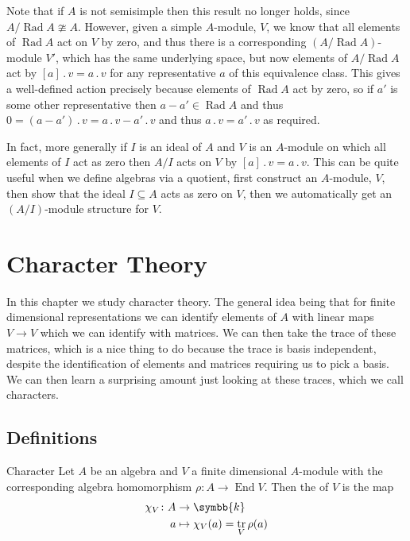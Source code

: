 \documentclass[fleqn]{NotesClass}
\renewcommand{\field}{\symbb{k}}
\DeclareMathOperator{\End}{End}
\newcommand{\action}{\mathbin{.}}
\DeclareMathOperator{\Rad}{Rad}
\DeclareMathOperator{\tr}{tr}
\begin{document}
    Note that if \(A\) is not semisimple then this result no longer holds, since \(A/\Rad A \ncong A\).
    However, given a simple \(A\)-module, \(V\), we know that all elements of \(\Rad A\) act on \(V\) by zero, and thus there is a corresponding \((A/\Rad A)\)-module \(V'\), which has the same underlying space, but now elements of \(A/\Rad A\) act by \([a] \action v = a \action v\) for any representative \(a\) of this equivalence class.
    This gives a well-defined action precisely because elements of \(\Rad A\) act by zero, so if \(a'\) is some other representative then \(a - a' \in \Rad A\) and thus \(0 = (a - a') \action v = a \action v - a' \action v\) and thus \(a \action v = a' \action v\) as required.
    
    In fact, more generally if \(I\) is an ideal of \(A\) and \(V\) is an \(A\)-module on which all elements of \(I\) act as zero then \(A/I\) acts on \(V\) by \([a] \action v = a \action v\).
    This can be quite useful when we define algebras via a quotient, first construct an \(A\)-module, \(V\), then show that the ideal \(I \subseteq A\) acts as zero on \(V\), then we automatically get an \((A/I)\)-module structure for \(V\).
    
    \chapter{Character Theory}
    In this chapter we study character theory.
    The general idea being that for finite dimensional representations we can identify elements of \(A\) with linear maps \(V \to V\) which we can identify with matrices.
    We can then take the trace of these matrices, which is a nice thing to do because the trace is basis independent, despite the identification of elements and matrices requiring us to pick a basis.
    We can then learn a surprising amount just looking at these traces, which we call characters.
    
    \section{Definitions}
    \begin{dfn}{Character}{}
        Let \(A\) be an algebra and \(V\) a finite dimensional \(A\)-module with the corresponding algebra homomorphism \(\rho \colon A \to \End V\).
        Then the  of \(V\) is the map
        \begin{align}
            \chi_V \colon A &\to \field\\
            a &\mapsto \chi_V(a) = \tr_V \rho(a)
        \end{align}
    \end{dfn}
    
\end{document}
